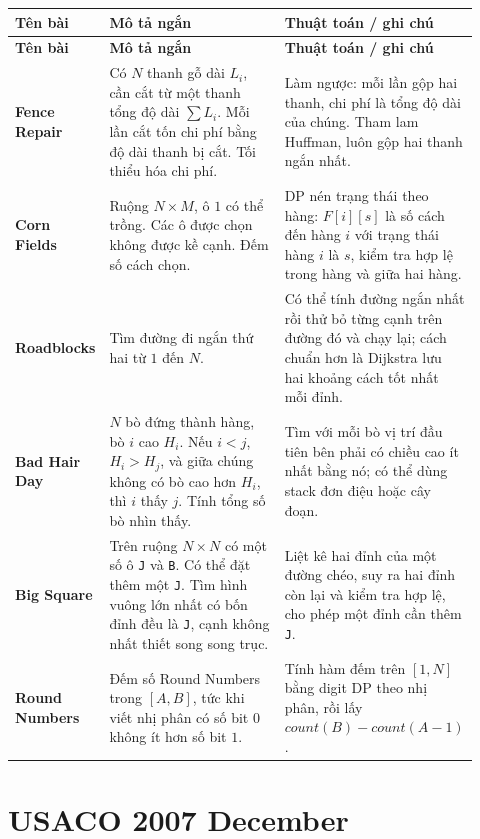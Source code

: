 \documentclass[11pt]{article}
\newenvironment{solutiontable}{%
  \small
  \setlength{\tabcolsep}{4pt}
  \renewcommand{\arraystretch}{1.14}
  \begin{longtable}{L{0.19\linewidth}L{0.39\linewidth}L{0.34\linewidth}}
  \toprule
  \textbf{Tên bài} & \textbf{Mô tả ngắn} & \textbf{Thuật toán / ghi chú}\\
  \midrule
  \endfirsthead
  \toprule
  \textbf{Tên bài} & \textbf{Mô tả ngắn} & \textbf{Thuật toán / ghi chú}\\
  \midrule
  \endhead
}{%
  \bottomrule
  \end{longtable}
  \normalsize
}
\newcommand{\problemrow}[3]{\textbf{#1} & #2 & #3\\\midrule}
\begin{document}
\begin{solutiontable}
\problemrow{Fence Repair}{Có \(N\) thanh gỗ dài \(L_i\), cần cắt từ một thanh tổng độ dài \(\sum L_i\). Mỗi lần cắt tốn chi phí bằng độ dài thanh bị cắt. Tối thiểu hóa chi phí.}{Làm ngược: mỗi lần gộp hai thanh, chi phí là tổng độ dài của chúng. Tham lam Huffman, luôn gộp hai thanh ngắn nhất.}
\problemrow{Corn Fields}{Ruộng \(N\times M\), ô \(1\) có thể trồng. Các ô được chọn không được kề cạnh. Đếm số cách chọn.}{DP nén trạng thái theo hàng: \(F[i][s]\) là số cách đến hàng \(i\) với trạng thái hàng \(i\) là \(s\), kiểm tra hợp lệ trong hàng và giữa hai hàng.}
\problemrow{Roadblocks}{Tìm đường đi ngắn thứ hai từ \(1\) đến \(N\).}{Có thể tính đường ngắn nhất rồi thử bỏ từng cạnh trên đường đó và chạy lại; cách chuẩn hơn là Dijkstra lưu hai khoảng cách tốt nhất mỗi đỉnh.}
\problemrow{Bad Hair Day}{\(N\) bò đứng thành hàng, bò \(i\) cao \(H_i\). Nếu \(i<j\), \(H_i>H_j\), và giữa chúng không có bò cao hơn \(H_i\), thì \(i\) thấy \(j\). Tính tổng số bò nhìn thấy.}{Tìm với mỗi bò vị trí đầu tiên bên phải có chiều cao ít nhất bằng nó; có thể dùng stack đơn điệu hoặc cây đoạn.}
\problemrow{Big Square}{Trên ruộng \(N\times N\) có một số ô \texttt{J} và \texttt{B}. Có thể đặt thêm một \texttt{J}. Tìm hình vuông lớn nhất có bốn đỉnh đều là \texttt{J}, cạnh không nhất thiết song song trục.}{Liệt kê hai đỉnh của một đường chéo, suy ra hai đỉnh còn lại và kiểm tra hợp lệ, cho phép một đỉnh cần thêm \texttt{J}.}
\problemrow{Round Numbers}{Đếm số Round Numbers trong \([A,B]\), tức khi viết nhị phân có số bit \(0\) không ít hơn số bit \(1\).}{Tính hàm đếm trên \([1,N]\) bằng digit DP theo nhị phân, rồi lấy \(count(B)-count(A-1)\).}
\end{solutiontable}

\section{USACO 2007 December}
\end{document}
